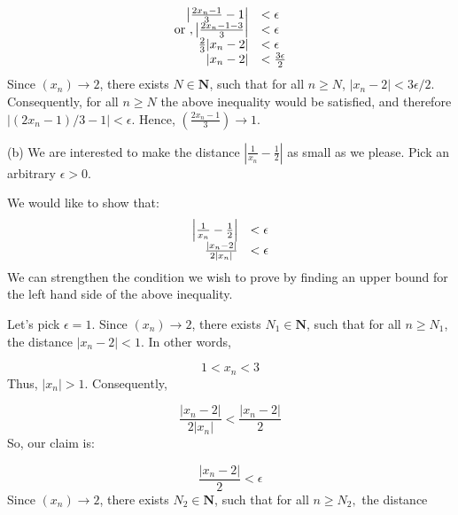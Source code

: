 \documentclass[10pt]{article}
\begin{document}
\begin{equation*}
\begin{array}{ r l }
\left| \frac{2x_{n} -1}{3} -1\right|  & < \epsilon \\
\text{or } ,\left| \frac{2x_{n} -1-3}{3}\right|  & < \epsilon \\
\frac{2}{3}| x_{n} -2|  & < \epsilon \\
| x_{n} -2|  & < \frac{3\epsilon }{2}
\end{array}
\end{equation*}
Since $\displaystyle ( x_{n})\rightarrow 2$, there exists $\displaystyle N\in \mathbf{N}$, such that for all $\displaystyle n\geq N$, $\displaystyle |x_{n} -2|< 3\epsilon /2$. Consequently, for all $\displaystyle n\geq N$ the above inequality would be satisfied, and therefore $\displaystyle |( 2x_{n} -1) /3-1|< \epsilon $. Hence, $\displaystyle \left(\frac{2x_{n} -1}{3}\right)\rightarrow 1$.



(b) We are interested to make the distance $\displaystyle \left| \frac{1}{x_{n}} -\frac{1}{2}\right| $ as small as we please. Pick an arbitrary $\displaystyle \epsilon  >0$. 

We would like to show that:
\begin{equation*}
\begin{array}{ r l }
\left| \frac{1}{x_{n}} -\frac{1}{2}\right|  & < \epsilon \\
\frac{|x_{n} -2|}{2|x_{n} |} & < \epsilon 
\end{array}
\end{equation*}
We can strengthen the condition we wish to prove by finding an upper bound for the left hand side of the above inequality.

 

Let's pick $\displaystyle \epsilon =1$. Since $\displaystyle ( x_{n})\rightarrow 2$, there exists $\displaystyle N_{1} \in \mathbf{N}$, such that for all $\displaystyle n\geq N_{1}$, the distance $\displaystyle |x_{n} -2|< 1$. In other words,


\begin{equation*}
1< x_{n} < 3
\end{equation*}
Thus, $\displaystyle |x_{n} | >1$. Consequently,


\begin{equation*}
\frac{|x_{n} -2|}{2|x_{n} |} < \frac{|x_{n} -2|}{2}
\end{equation*}
So, our claim is:


\begin{equation*}
\frac{|x_{n} -2|}{2} < \epsilon 
\end{equation*}
Since $\displaystyle ( x_{n})\rightarrow 2$, there exists $\displaystyle N_{2} \in \mathbf{N}$, such that for all $\displaystyle n\geq N_{2} ,$ the distance 
\end{document}
